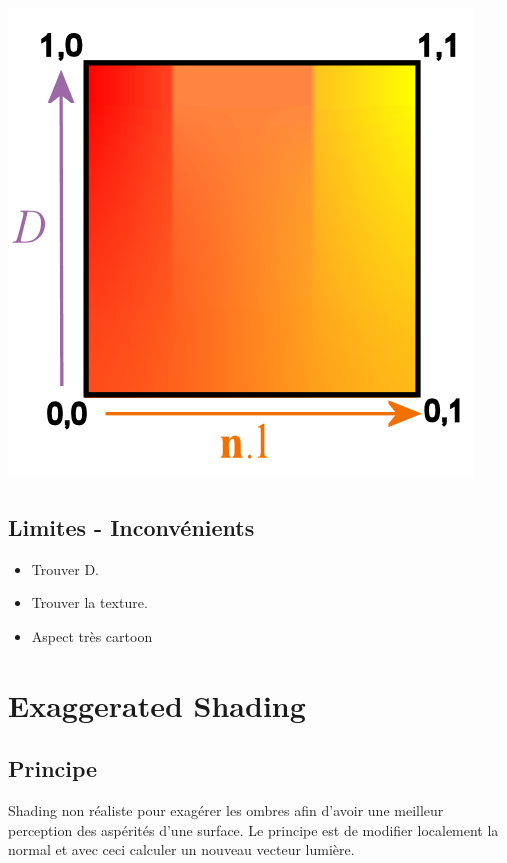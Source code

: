 \documentclass[a4paper]{article}
\begin{document}
\begin{center}
\includegraphics[scale=0.2]{xToon.png}
\end{center}


\subsection{Limites - Inconvénients}
\begin{itemize}
\item Trouver D.
\item Trouver la texture.
\item Aspect très cartoon
\end{itemize}


\section{Exaggerated Shading}
\subsection{Principe}
Shading non réaliste pour exagérer les ombres afin d'avoir une meilleur perception des aspérités d'une surface.  
Le principe est de modifier localement la normal et avec ceci calculer un nouveau vecteur lumière. 
\end{document}

